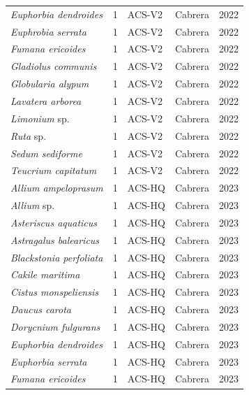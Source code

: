 \documentclass[]{article}
\renewcommand{\(}{\left(}
\renewcommand{\)}{\right)}
\renewcommand{\[}{\left[}
\renewcommand{\]}{\right]}
\begin{document}
\begin{longtable}{l r l l r}
    \textit{Euphorbia dendroides}          & 1 & ACS-V2    & Cabrera    & 2022 \\
    \textit{Euphrobia serrata}             & 1 & ACS-V2    & Cabrera    & 2022 \\
    \textit{Fumana ericoides}              & 1 & ACS-V2    & Cabrera    & 2022 \\
    \textit{Gladiolus communis}            & 1 & ACS-V2    & Cabrera    & 2022 \\
    \textit{Globularia alypum}             & 1 & ACS-V2    & Cabrera    & 2022 \\
    \textit{Lavatera arborea}              & 1 & ACS-V2    & Cabrera    & 2022 \\
    \textit{Limonium} sp.                   & 1 & ACS-V2    & Cabrera    & 2022 \\
    \textit{Ruta} sp.                       & 1 & ACS-V2    & Cabrera    & 2022 \\
    \textit{Sedum sediforme}               & 1 & ACS-V2    & Cabrera    & 2022 \\
    \textit{Teucrium capitatum}            & 1 & ACS-V2    & Cabrera    & 2022 \\
    \textit{Allium ampeloprasum}           & 1 & ACS-HQ    & Cabrera    & 2023 \\
    \textit{Allium} sp.                     & 1 & ACS-HQ    & Cabrera    & 2023 \\
    \textit{Asteriscus aquaticus}          & 1 & ACS-HQ    & Cabrera    & 2023 \\
    \textit{Astragalus balearicus}         & 1 & ACS-HQ    & Cabrera    & 2023 \\
    \textit{Blackstonia perfoliata}        & 1 & ACS-HQ    & Cabrera    & 2023 \\
    \textit{Cakile maritima}               & 1 & ACS-HQ    & Cabrera    & 2023 \\
    \textit{Cistus monspeliensis}          & 1 & ACS-HQ    & Cabrera    & 2023 \\
    \textit{Daucus carota}                 & 1 & ACS-HQ    & Cabrera    & 2023 \\
    \textit{Dorycnium fulgurans}           & 1 & ACS-HQ    & Cabrera    & 2023 \\
    \textit{Euphorbia dendroides}          & 1 & ACS-HQ    & Cabrera    & 2023 \\
    \textit{Euphorbia serrata}             & 1 & ACS-HQ    & Cabrera    & 2023 \\
    \textit{Fumana ericoides}              & 1 & ACS-HQ    & Cabrera    & 2023 \\

\end{longtable}
\end{document}
